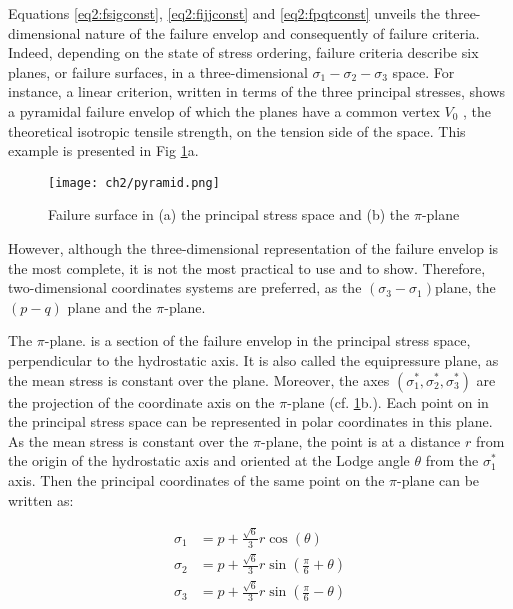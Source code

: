 Equations \ref{eq2:fsigconst}, \ref{eq2:fijjconst} and \ref{eq2:fpqtconst} unveils the three-dimensional nature of the failure envelop and consequently of failure criteria. Indeed, depending on the state of stress ordering, failure criteria describe six planes, or failure surfaces, in a three-dimensional $\sigma_1 -\sigma_2 -\sigma_3$  space. For instance, a linear criterion, written in terms of the three principal stresses, shows a pyramidal failure envelop of which the planes have a common vertex $V_0$ , the theoretical isotropic tensile strength, on the tension side of the space. This example is presented in Fig \ref{fig2:pyramid}a.  

\begin{figure}[tb]
    \centering
    \texttt{[image: ch2/pyramid.png]}
    \caption{Failure surface in (a) the principal stress space and (b) the $\pi$-plane \cite[Labuz 2018]{Labuz2018}}
    \label{fig2:pyramid}
\end{figure}

However, although the three-dimensional representation of the failure envelop is the most complete, it is not the most practical to use and to show. Therefore, two-dimensional coordinates systems are preferred, as the  $(\sigma_3 -\sigma_1)$plane, the  $(p-q)$ plane and the $\pi$-plane.  

The $\pi$-plane. is a section of the failure envelop in the principal stress space, perpendicular to the hydrostatic axis. It is also called the equipressure plane, as the mean stress is constant over the plane. Moreover, the axes $(\sigma_1^*,\sigma_2^*,\sigma_3^*)$ are the projection of the coordinate axis on the $\pi$-plane (cf. \ref{fig2:pyramid}b.). Each point on in the principal stress space can be represented in polar coordinates in this plane. As the mean stress is constant over the $\pi$-plane, the point is at a distance $r$ from the origin of the hydrostatic axis and oriented at the Lodge angle $\theta$ from the  $\sigma_1^*$ axis. Then the principal coordinates of the same point on the $\pi$-plane can be written as: 

\begin{align}
    \sigma_1 &= p + \frac{\sqrt{6}}{3}r\cos\left(\theta\right) \label{eq2:sig1}\\
    \sigma_2 &= p + \frac{\sqrt{6}}{3}r\sin\left(\frac{\pi}{6}+\theta\right)\\
    \sigma_3 &= p + \frac{\sqrt{6}}{3}r\sin\left(\frac{\pi}{6}-\theta\right) \label{eq2:sig3}
\end{align}

